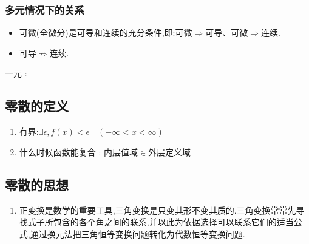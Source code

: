\documentclass[UTF8,12pt]{ctexbook}
\begin{document}
{{{{    \begin{center}
    \end{center}
  }%

  \subsubsection{多元情况下的关系}{
    \begin{itemize}
      \item 可微(全微分)是可导和连续的充分条件,即:可微$\Rightarrow$可导、可微$\Rightarrow$连续.
      \item 可导$\nRightarrow$连续.
    \end{itemize}

    \begin{center}
      一元 :
    \end{center}
  }%

}%


\subsection{零散的定义}{
  \begin{enumerate}
    \item 有界:$\exists\epsilon,f(x) < \epsilon\quad(-\infty < x < \infty )$
    \item 什么时候函数能复合 : 内层值域$\in$外层定义域
  \end{enumerate}
}%

\subsection{零散的思想}{
  \begin{enumerate}
    \item 正变换是数学的重要工具,三角变换是只变其形不变其质的.三角变换常常先寻找式子所包含的各个角之间的联系,并以此为依据选择可以联系它们的适当公式,通过换元法把三角恒等变换问题转化为代数恒等变换问题.
  \end{enumerate}
}%

}}
\end{document}
